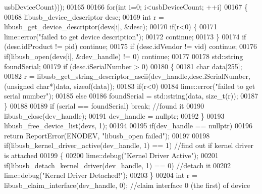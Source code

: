 \begin{DoxyCode}
{      usbDeviceCount)));
00165 
00166     \textcolor{keywordflow}{for}(\textcolor{keywordtype}{int} i=0; i<usbDeviceCount; ++i)
00167     \{
00168         libusb\_device\_descriptor desc;
00169         \textcolor{keywordtype}{int} r = libusb\_get\_device\_descriptor(devs[i], &desc);
00170         \textcolor{keywordflow}{if}(r<0) \{
00171             lime::error(\textcolor{stringliteral}{"failed to get device description"});
00172             \textcolor{keywordflow}{continue};
00173         \}
00174         \textcolor{keywordflow}{if} (desc.idProduct != pid) \textcolor{keywordflow}{continue};
00175         \textcolor{keywordflow}{if} (desc.idVendor != vid) \textcolor{keywordflow}{continue};
00176         \textcolor{keywordflow}{if}(libusb\_open(devs[i], &dev\_handle) != 0) \textcolor{keywordflow}{continue};
00177 
00178         std::string foundSerial;
00179         \textcolor{keywordflow}{if} (desc.iSerialNumber > 0)
00180         \{
00181             \textcolor{keywordtype}{char} data[255];
00182             r = libusb\_get\_string\_descriptor\_ascii(dev\_handle,desc.iSerialNumber,(\textcolor{keywordtype}{unsigned} \textcolor{keywordtype}{char}*)data, \textcolor{keyword}{
      sizeof}(data));
00183             \textcolor{keywordflow}{if}(r<0)
00184                 lime::error(\textcolor{stringliteral}{"failed to get serial number"});
00185             \textcolor{keywordflow}{else}
00186                 foundSerial = std::string(data, \textcolor{keywordtype}{size\_t}(r));
00187         \}
00188 
00189         \textcolor{keywordflow}{if} (serial == foundSerial) \textcolor{keywordflow}{break}; \textcolor{comment}{//found it}
00190         libusb\_close(dev\_handle);
00191         dev\_handle = \textcolor{keyword}{nullptr};
00192     \}
00193     libusb\_free\_device\_list(devs, 1);
00194 
00195     \textcolor{keywordflow}{if}(dev\_handle == \textcolor{keyword}{nullptr})
00196         \textcolor{keywordflow}{return} ReportError(ENODEV, \textcolor{stringliteral}{"libusb\_open failed"});
00197 
00198     \textcolor{keywordflow}{if}(libusb\_kernel\_driver\_active(dev\_handle, 1) == 1)   \textcolor{comment}{//find out if kernel driver is attached}
00199     \{
00200         lime::debug(\textcolor{stringliteral}{"Kernel Driver Active"});
00201         \textcolor{keywordflow}{if}(libusb\_detach\_kernel\_driver(dev\_handle, 1) == 0) \textcolor{comment}{//detach it}
00202             lime::debug(\textcolor{stringliteral}{"Kernel Driver Detached!"});
00203     \}
00204     \textcolor{keywordtype}{int} r = libusb\_claim\_interface(dev\_handle, 0); \textcolor{comment}{//claim interface 0 (the first) of device}
}
\end{DoxyCode}
